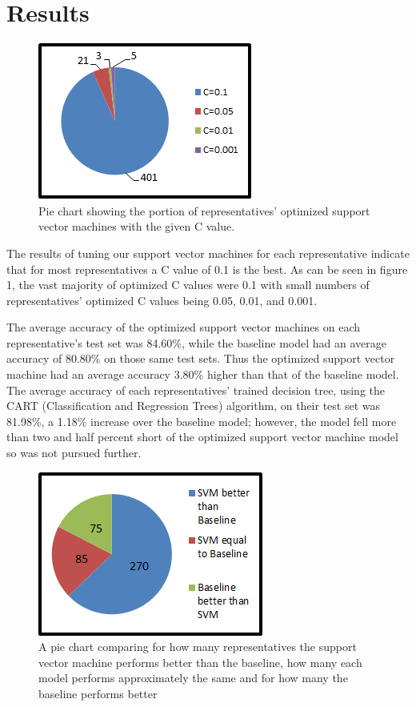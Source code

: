 \documentclass[11pt,letterpaper,twocolumn]{article}
\begin{document}
\section{Results}

\begin{figure}
\centering
\includegraphics{c_values2.png}
\caption{Pie chart showing the portion of representatives' optimized support vector machines with the given C value.}
\end{figure}

The results of tuning our support vector machines for each representative indicate that for most representatives a C value of 0.1 is the best. As can be seen in figure 1, the vast majority of optimized C values were 0.1 with small numbers of representatives' optimized C values being 0.05, 0.01, and 0.001.

The average accuracy of the optimized support vector machines on each representative's test set was 84.60\%, while the baseline model had an average accuracy of 80.80\% on those same test sets. Thus the optimized support vector machine had an average accuracy 3.80\% higher than that of the baseline model. The average accuracy of each representatives' trained decision tree, using the CART (Classification and Regression Trees) algorithm, on their test set was 81.98\%, a 1.18\% increase over the baseline model; however, the model fell more than two and half percent short of the optimized support vector machine model so was not pursued further.

\begin{figure}
\centering
\includegraphics{pie_chart_12.png}
\caption{A pie chart comparing for how many representatives the support vector machine performs better than the baseline, how many each model performs approximately the same and for how many the baseline performs better}
\end{figure}
\end{document}
